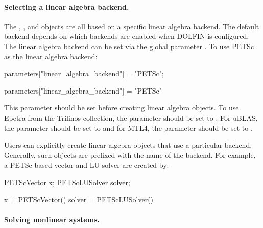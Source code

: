 \paragraph{Selecting a linear algebra backend.}

The , ,  and 
objects are all based on a specific linear algebra backend.
The default backend depends on which backends are enabled when DOLFIN
is configured.  The linear algebra backend can be set via the global
parameter .  To use PETSc as the linear
algebra backend:
\begin{c++}
parameters["linear_algebra_backend"] = "PETSc";
\end{c++}
\begin{python}
parameters["linear_algebra_backend"] = "PETSc"
\end{python}
This parameter should be set before creating linear algebra
objects. To use Epetra from the Trilinos collection, the parameter
 should be set to .
For uBLAS, the parameter should be set to  and for MTL4, the
parameter should be set to .

Users can explicitly create linear algebra objects that use a
particular backend. Generally, such objects are prefixed with the name
of the backend. For example, a PETSc-based vector and LU solver are
created by:
\begin{c++}
PETScVector x;
PETScLUSolver solver;
\end{c++}
\begin{python}
x = PETScVector()
solver = PETScLUSolver()
\end{python}


\paragraph{Solving nonlinear systems.}

